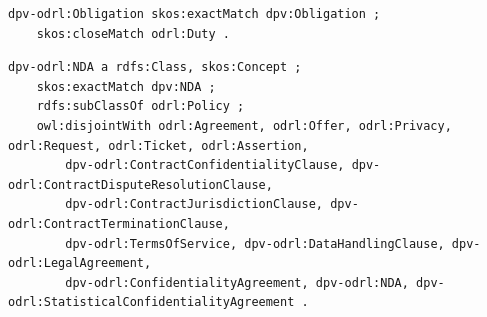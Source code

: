 \begin{scriptsize}
\begin{lstlisting}[language=turtle, caption=DPV-ODRL mapping for the Obligation concept., label=lst:rule]
dpv-odrl:Obligation skos:exactMatch dpv:Obligation ;
	skos:closeMatch odrl:Duty .
\end{lstlisting}
\end{scriptsize}

\begin{scriptsize}
\begin{lstlisting}[language=turtle, caption=DPV-ODRL mapping for the NDA concept., label=lst:policy]
dpv-odrl:NDA a rdfs:Class, skos:Concept ;
    skos:exactMatch dpv:NDA ;
	rdfs:subClassOf odrl:Policy ;
	owl:disjointWith odrl:Agreement, odrl:Offer, odrl:Privacy, odrl:Request, odrl:Ticket, odrl:Assertion,
        dpv-odrl:ContractConfidentialityClause, dpv-odrl:ContractDisputeResolutionClause,
        dpv-odrl:ContractJurisdictionClause, dpv-odrl:ContractTerminationClause,
        dpv-odrl:TermsOfService, dpv-odrl:DataHandlingClause, dpv-odrl:LegalAgreement,
        dpv-odrl:ConfidentialityAgreement, dpv-odrl:NDA, dpv-odrl:StatisticalConfidentialityAgreement .
\end{lstlisting}
\end{scriptsize}
